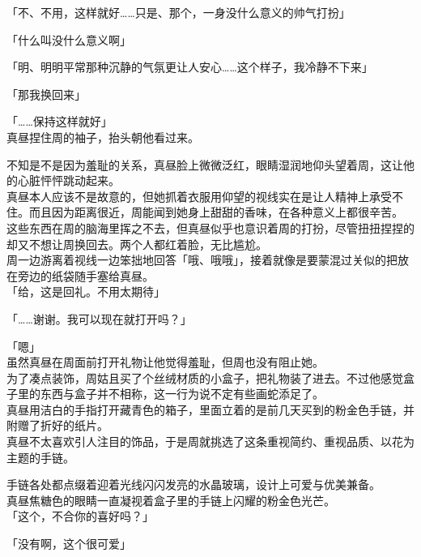 「不、不用，这样就好……只是、那个，一身没什么意义的帅气打扮」

「什么叫没什么意义啊」

「明、明明平常那种沉静的气氛更让人安心……这个样子，我冷静不下来」

「那我换回来」

「……保持这样就好」\\

真昼捏住周的袖子，抬头朝他看过来。

不知是不是因为羞耻的关系，真昼脸上微微泛红，眼睛湿润地仰头望着周，这让他的心脏怦怦跳动起来。\\

真昼本人应该不是故意的，但她抓着衣服用仰望的视线实在是让人精神上承受不住。而且因为距离很近，周能闻到她身上甜甜的香味，在各种意义上都很辛苦。\\

这些东西在周的脑海里挥之不去，但真昼似乎也意识着周的打扮，尽管扭扭捏捏的却又不想让周换回去。两个人都红着脸，无比尴尬。\\

周一边游离着视线一边笨拙地回答「哦、哦哦」，接着就像是要蒙混过关似的把放在旁边的纸袋随手塞给真昼。\\

「给，这是回礼。不用太期待」

「……谢谢。我可以现在就打开吗？」

「嗯」\\

虽然真昼在周面前打开礼物让他觉得羞耻，但周也没有阻止她。\\

为了凑点装饰，周姑且买了个丝绒材质的小盒子，把礼物装了进去。不过他感觉盒子里的东西与盒子并不相称，这一行为说不定有些画蛇添足了。\\

真昼用洁白的手指打开藏青色的箱子，里面立着的是前几天买到的粉金色手链，并附赠了折好的纸片。\\

真昼不太喜欢引人注目的饰品，于是周就挑选了这条重视简约、重视品质、以花为主题的手链。

手链各处都点缀着迎着光线闪闪发亮的水晶玻璃，设计上可爱与优美兼备。\\

真昼焦糖色的眼睛一直凝视着盒子里的手链上闪耀的粉金色光芒。\\

「这个，不合你的喜好吗？」

「没有啊，这个很可爱」

